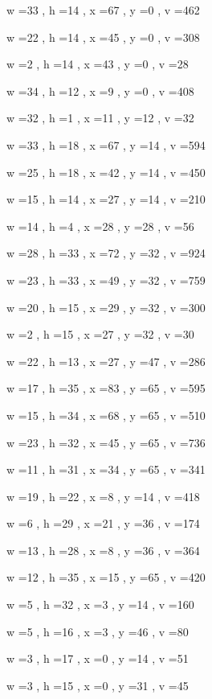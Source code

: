\documentclass[11pt]{article}
\begin{document}
w =33 , h =14 , x =67 , y =0 , v =462
\par
w =22 , h =14 , x =45 , y =0 , v =308
\par
w =2 , h =14 , x =43 , y =0 , v =28
\par
w =34 , h =12 , x =9 , y =0 , v =408
\par
w =32 , h =1 , x =11 , y =12 , v =32
\par
w =33 , h =18 , x =67 , y =14 , v =594
\par
w =25 , h =18 , x =42 , y =14 , v =450
\par
w =15 , h =14 , x =27 , y =14 , v =210
\par
w =14 , h =4 , x =28 , y =28 , v =56
\par
w =28 , h =33 , x =72 , y =32 , v =924
\par
w =23 , h =33 , x =49 , y =32 , v =759
\par
w =20 , h =15 , x =29 , y =32 , v =300
\par
w =2 , h =15 , x =27 , y =32 , v =30
\par
w =22 , h =13 , x =27 , y =47 , v =286
\par
w =17 , h =35 , x =83 , y =65 , v =595
\par
w =15 , h =34 , x =68 , y =65 , v =510
\par
w =23 , h =32 , x =45 , y =65 , v =736
\par
w =11 , h =31 , x =34 , y =65 , v =341
\par
w =19 , h =22 , x =8 , y =14 , v =418
\par
w =6 , h =29 , x =21 , y =36 , v =174
\par
w =13 , h =28 , x =8 , y =36 , v =364
\par
w =12 , h =35 , x =15 , y =65 , v =420
\par
w =5 , h =32 , x =3 , y =14 , v =160
\par
w =5 , h =16 , x =3 , y =46 , v =80
\par
w =3 , h =17 , x =0 , y =14 , v =51
\par
w =3 , h =15 , x =0 , y =31 , v =45
\par
\newpage
\end{document}
